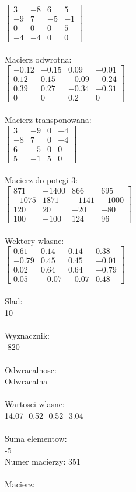 \documentclass[a4paper,12pt]{article}
\begin{document}
$\begin{bmatrix} 3&-8&6&5\\-9&7&-5&-1\\0&0&0&5\\-4&-4&0&0 \end{bmatrix}$
\\
\\
Macierz odwrotna:\\

$\begin{bmatrix} -0.12&-0.15&0.09&-0.01\\0.12&0.15&-0.09&-0.24\\0.39&0.27&-0.34&-0.31\\0&0&0.2&0 \end{bmatrix}$
\\
\\
Macierz transponowana:\\

$\begin{bmatrix} 3&-9&0&-4\\-8&7&0&-4\\6&-5&0&0\\5&-1&5&0 \end{bmatrix}$
\\
\\
Macierz do potegi 3:\\

$\begin{bmatrix} 871&-1400&866&695\\-1075&1871&-1141&-1000\\120&20&-20&-80\\100&-100&124&96 \end{bmatrix}$
\\
\\
Wektory wlasne:\\

$\begin{bmatrix} 0.61&0.14&0.14&0.38\\-0.79&0.45&0.45&-0.01\\0.02&0.64&0.64&-0.79\\0.05&-0.07&-0.07&0.48 \end{bmatrix}$
\\
\\
Slad:\\
10
\\
\\
Wyznacznik:\\
-820
\\
\\
Odwracalnosc:\\
Odwracalna
\\
\\
Wartosci wlasne:\\
14.07 -0.52 -0.52 -3.04
\\
\\
Suma elementow:\\
-5
\\
\newpage
Numer macierzy:
351
\\
\\
Macierz:\\
\end{document}
